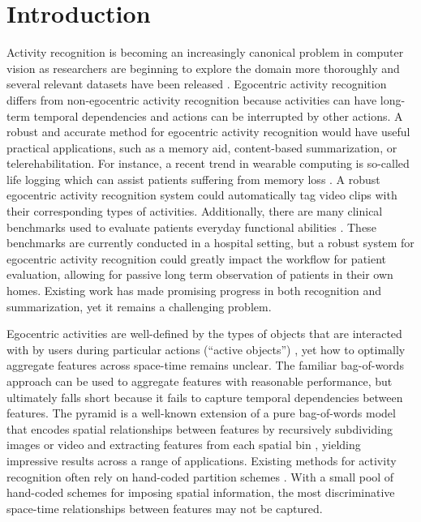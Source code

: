 \documentclass{bmvc2k}
\begin{document}
\section{Introduction}
	Activity recognition is becoming an increasingly canonical problem in
	computer vision as researchers are beginning to explore the domain more
  thoroughly and several relevant datasets have been released 
  \cite{Schuldt04, Rodriguez08, Fathi11, Ramanan12}. 
  Egocentric activity recognition differs from
  non-egocentric activity recognition because activities can have long-term
  temporal dependencies and actions can be interrupted by other actions. 
	A robust and accurate method for egocentric activity recognition would have 
	useful practical applications, such as a memory aid, content-based
  summarization, or telerehabilitation. For instance,
	a recent trend in wearable computing is so-called life logging which can
	assist patients suffering from memory loss \cite{Sellen07}. 
	A robust egocentric activity recognition
	system could automatically tag video clips with their corresponding types of activities.
  Additionally, there are many clinical benchmarks used to evaluate patients everyday
  functional abilities \cite{Kopp97, Catz97, Itzkovich07}. 
  These benchmarks are currently conducted in a
  hospital setting, but a robust system for egocentric activity
  recognition
  could greatly impact the workflow for patient evaluation, allowing
  for passive long term observation of patients in their own
  homes.
  Existing work has made promising progress in both recognition and
  summarization, \cite{Ramanan12, Fathi12,Lee12} 
  yet it remains a challenging problem.






  Egocentric activities
  are well-defined by the types of objects that are interacted with by users
  during particular actions (``active objects'') \cite{Ramanan12}, yet how to optimally aggregate
  features across space-time remains unclear.
  The familiar bag-of-words approach can be used to aggregate 
  features with reasonable performance, but ultimately falls short because it
  fails to capture temporal dependencies between features.
  The pyramid is a well-known extension of a pure bag-of-words model that encodes spatial
  relationships between features by recursively subdividing images or video and extracting 
  features from each spatial bin \cite{Lazebnik06}, yielding impressive
  results across a range of applications.
  Existing methods for activity recognition often rely on
  hand-coded partition schemes \cite{Ramanan12, Choi08, Laptev08}.
  With a small pool of hand-coded schemes for imposing spatial
  information, the most discriminative space-time relationships between features may not be 
  captured. 
\end{document}
